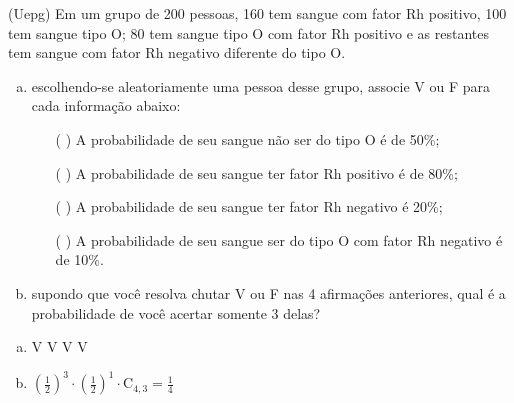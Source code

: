 \begin{ex}
(Uepg) Em um grupo de 200 pessoas, 160 tem sangue com fator Rh positivo, 100 tem sangue tipo O;  80 tem sangue tipo O com fator Rh positivo e as restantes tem sangue com fator Rh  negativo diferente do tipo O.
   \begin{enumerate}[(a)]
   \item escolhendo-se aleatoriamente uma pessoa desse grupo, associe V ou F para cada informação abaixo:
       \begin{itemize}
       \item [(  )] A probabilidade de seu sangue não ser do tipo O é de 50\%;
       \item [(  )] A probabilidade de seu sangue ter fator Rh positivo é de 80\%;
       \item [(  )] A probabilidade de seu sangue ter fator Rh negativo é 20\%;
       \item [(  )] A probabilidade de seu sangue ser do tipo O com fator Rh negativo é de 10\%.
       \end{itemize}
   \item supondo que você resolva chutar V ou F nas 4 afirmações  anteriores, qual é a probabilidade de você acertar somente 3 delas?
   \end{enumerate}
     \begin{sol}
      \phantom{A}
        \begin{enumerate} [(a)]
            \item V V V V 
            \item $(\frac{1}{2})^3\cdot(\frac{1}{2})^1\cdot\mathrm{C}_{4,3}=\frac{1}{4}$
        \end{enumerate}
     \end{sol}
\end{ex}